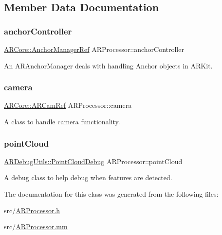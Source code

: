 \subsection{Member Data Documentation}
\mbox{\label{class_a_r_processor_a8a1a8f16b30d2b0b4839a30d7ba4763d}} 
\subsubsection{\texorpdfstring{anchor\+Controller}{anchorController}}
{\footnotesize\ttfamily \hyperlink{namespace_a_r_core_a3f2b9ba00b51ce19c1010f554a66a512}{A\+R\+Core\+::\+Anchor\+Manager\+Ref} A\+R\+Processor\+::anchor\+Controller}



An A\+R\+Anchor\+Manager deals with handling Anchor objects in A\+R\+Kit. 

\mbox{\label{class_a_r_processor_a0df4995c56cb187db281726d7631d9ed}} 
\subsubsection{\texorpdfstring{camera}{camera}}
{\footnotesize\ttfamily \hyperlink{namespace_a_r_core_a4ebe9e23907235fcf76bf65440fde0e0}{A\+R\+Core\+::\+A\+R\+Cam\+Ref} A\+R\+Processor\+::camera}



A class to handle camera functionality. 

\mbox{\label{class_a_r_processor_a555e829fbf6b625537f6fd7cd9557002}} 
\subsubsection{\texorpdfstring{point\+Cloud}{pointCloud}}
{\footnotesize\ttfamily \hyperlink{class_a_r_debug_utils_1_1_point_cloud_debug}{A\+R\+Debug\+Utils\+::\+Point\+Cloud\+Debug} A\+R\+Processor\+::point\+Cloud}



A debug class to help debug when features are detected. 



The documentation for this class was generated from the following files\+:\begin{DoxyCompactItemize}
\item 
src/\hyperlink{_a_r_processor_8h}{A\+R\+Processor.\+h}\item 
src/\hyperlink{_a_r_processor_8mm}{A\+R\+Processor.\+mm}\end{DoxyCompactItemize}
